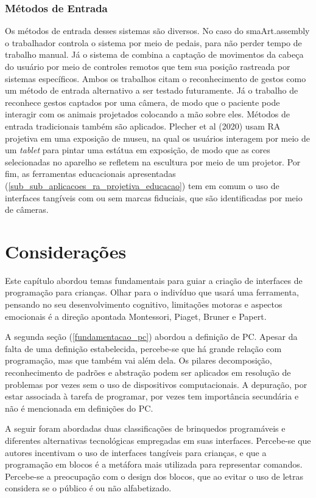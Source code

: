 \subsubsection{Métodos de Entrada}
Os métodos de entrada desses sistemas são diversos. No caso do smaArt.assembly o trabalhador controla o sistema por meio de pedais, para não perder tempo de trabalho manual. Já o sistema de  combina a captação de movimentos da cabeça do usuário por meio de controles remotos que tem sua posição rastreada por sistemas específicos. Ambos os trabalhos citam o reconhecimento de gestos como um método de entrada alternativo a ser testado futuramente. Já o trabalho de  reconhece gestos captados por uma câmera, de modo que o paciente pode interagir com os animais projetados colocando a mão sobre eles. Métodos de entrada tradicionais também são aplicados. Plecher et al (2020) usam RA projetiva em uma exposição de museu, na qual os usuários interagem por meio de um \textit{tablet} para pintar uma estátua em exposição, de modo que as cores selecionadas no aparelho se refletem na escultura por meio de um projetor. Por fim, as ferramentas educacionais apresentadas (\autoref{sub_sub_aplicacoes_ra_projetiva_educacao}) tem em comum o uso de interfaces tangíveis com ou sem marcas fiduciais, que são identificadas por meio de câmeras.

\section{Considerações}

Este capítulo abordou temas fundamentais para guiar a criação de interfaces de programação para crianças. Olhar para o indivíduo que usará uma ferramenta, pensando no seu desenvolvimento cognitivo, limitações motoras e aspectos emocionais é a direção apontada Montessori, Piaget, Bruner e Papert. 

A segunda seção (\autoref{fundamentacao_pc}) abordou a definição de \acl{PC}. Apesar da falta de uma definição estabelecida, percebe-se que há grande relação com programação, mas que também vai além dela. Os pilares decomposição, reconhecimento de padrões e abstração podem ser aplicados em resolução de problemas por vezes sem o uso de dispositivos computacionais. A depuração, por estar associada à tarefa de programar, por vezes tem importância secundária e não é mencionada em definições do PC. 

A seguir foram abordadas duas classificações de brinquedos programáveis e diferentes alternativas tecnológicas empregadas em suas interfaces. Percebe-se que autores incentivam o uso de interfaces tangíveis para crianças, e que a programação em blocos é a metáfora mais utilizada para representar comandos. Percebe-se a preocupação com o design dos blocos, que ao evitar o uso de letras considera se o público é ou não alfabetizado.

